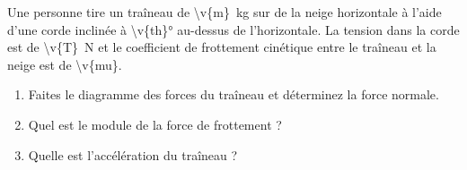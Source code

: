 Une personne tire un traîneau de \qty{\v{m}}{kg} sur de la neige horizontale à l'aide d'une corde inclinée à \ang{\v{th}} au-dessus de l'horizontale. La tension dans la corde est de \qty{\v{T}}{N} et le coefficient de frottement cinétique entre le traîneau et la neige est de \num{\v{mu}}.

\begin{enumerate}[label=\alph*)]
    \item Faites le diagramme des forces du traîneau et déterminez la force normale.
    \item Quel est le module de la force de frottement ?
    \item Quelle est l'accélération du traîneau ?
\end{enumerate}
